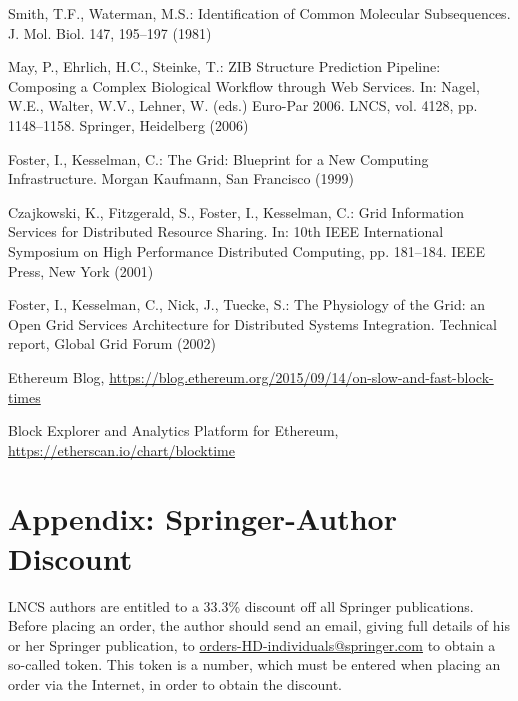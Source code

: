 \documentclass[runningheads,a4paper]{llncs}
\begin{document}
\begin{thebibliography}{4}

 Smith, T.F., Waterman, M.S.: Identification of Common Molecular
Subsequences. J. Mol. Biol. 147, 195--197 (1981)

 May, P., Ehrlich, H.C., Steinke, T.: ZIB Structure Prediction Pipeline:
Composing a Complex Biological Workflow through Web Services. In: Nagel,
W.E., Walter, W.V., Lehner, W. (eds.) Euro-Par 2006. LNCS, vol. 4128,
pp. 1148--1158. Springer, Heidelberg (2006)

 Foster, I., Kesselman, C.: The Grid: Blueprint for a New Computing
Infrastructure. Morgan Kaufmann, San Francisco (1999)

 Czajkowski, K., Fitzgerald, S., Foster, I., Kesselman, C.: Grid
Information Services for Distributed Resource Sharing. In: 10th IEEE
International Symposium on High Performance Distributed Computing, pp.
181--184. IEEE Press, New York (2001)

 Foster, I., Kesselman, C., Nick, J., Tuecke, S.: The Physiology of the
Grid: an Open Grid Services Architecture for Distributed Systems
Integration. Technical report, Global Grid Forum (2002)

 Ethereum Blog, 
\url{https://blog.ethereum.org/2015/09/14/on-slow-and-fast-block-times}

 Block Explorer and Analytics Platform for Ethereum, 
\url{https://etherscan.io/chart/blocktime}

\end{thebibliography}


\section*{Appendix: Springer-Author Discount}

LNCS authors are entitled to a 33.3\% discount off all Springer
publications. Before placing an order, the author should send an email, 
giving full details of his or her Springer publication,
to \url{orders-HD-individuals@springer.com} to obtain a so-called token. This token is a
number, which must be entered when placing an order via the Internet, in
order to obtain the discount.
\end{document}
